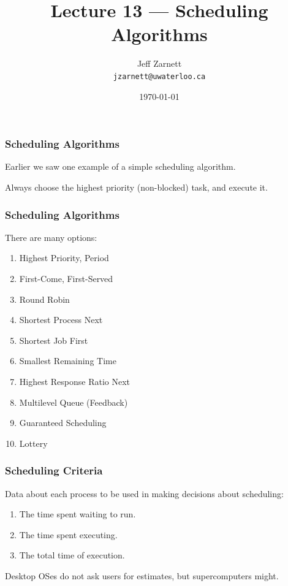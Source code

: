 

\title{Lecture 13 --- Scheduling Algorithms}

\author{Jeff Zarnett \\ \small \texttt{jzarnett@uwaterloo.ca}}
\date{\today}




\begin{frame}
  \titlepage

 \end{frame}



\begin{frame}
\frametitle{Scheduling Algorithms}

Earlier we saw one example of a simple scheduling algorithm. 

Always choose the highest priority (non-blocked) task, and execute it. 

 \end{frame}



\begin{frame}
\frametitle{Scheduling Algorithms}


There are many options:
\begin{enumerate}
	\item Highest Priority, Period
	\item First-Come, First-Served
	\item Round Robin
	\item Shortest Process Next
	\item Shortest Job First
	\item Smallest Remaining Time
	\item Highest Response Ratio Next
	\item Multilevel Queue (Feedback)
	\item Guaranteed Scheduling
	\item Lottery
\end{enumerate}


\end{frame}

\begin{frame}
\frametitle{Scheduling Criteria}

Data about each process to be used in making decisions about scheduling:

\begin{enumerate}
	\item The time spent waiting to run.
	\item The time spent executing.
	\item The total time of execution.
\end{enumerate}

Desktop OSes do not ask users for estimates, but supercomputers might.

\end{frame}

